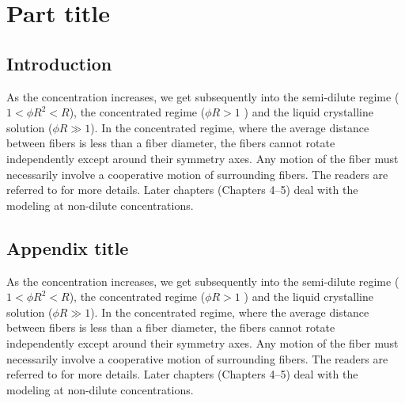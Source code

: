 \documentclass[english,fleqn,allpages]{ISTE_science}[2018/07/30]
\begin{document}
\part{Part title}

\chapter*{Introduction}

As the concentration increases, we get subsequently into the semi-dilute
regime ($1<\phi R^{2}<R$), the concentrated regime ($\phi R>1$ )
and the liquid crystalline solution ($\phi R\gg1$). In the concentrated
regime, where the average distance between fibers is less than a fiber
diameter, the fibers cannot rotate independently except around their
symmetry axes. Any motion of the fiber must necessarily involve a
cooperative motion of surrounding fibers. The readers are referred
to \cite{doi88} for more details. Later chapters (Chapters 4--5) deal with
the modeling at non-dilute concentrations.

\appendix
\chapter{Appendix title}

As the concentration increases, we get subsequently into the semi-dilute
regime ($1<\phi R^{2}<R$), the concentrated regime ($\phi R>1$ )
and the liquid crystalline solution ($\phi R\gg1$). In the concentrated
regime, where the average distance between fibers is less than a fiber
diameter, the fibers cannot rotate independently except around their
symmetry axes. Any motion of the fiber must necessarily involve a
cooperative motion of surrounding fibers. The readers are referred
to \cite{doi88} for more details. Later chapters (Chapters 4--5) deal with
the modeling at non-dilute concentrations.


\vfill\pagebreak
\
\thispagestyle{empty}
\end{document}
